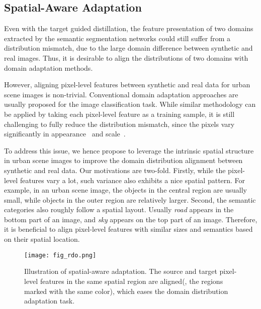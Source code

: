 \documentclass[10pt,twocolumn,letterpaper]{article}
\begin{document}
\subsection{Spatial-Aware Adaptation}
Even with the target guided distillation, the feature presentation of two domains extracted by the semantic segmentation networks could still suffer from a distribution mismatch, due to the large domain difference between synthetic and real images. Thus, it is desirable to align the distributions of two domains with domain adaptation methods. 

However, aligning pixel-level features between synthetic and real data for urban scene images is non-trivial. Conventional domain adaptation approaches are usually proposed for the image classification task. While similar methodology can be applied by taking each pixel-level feature as a training sample, it is still challenging to fully reduce the distribution mismatch, since the pixels vary significantly in appearance~\cite{hoffman2016fcns} and scale~\cite{chen2016scale}.

To address this issue, we hence propose to leverage the intrinsic spatial structure in urban scene images to improve the domain distribution alignment between synthetic and real data. Our motivations are two-fold. Firstly, while the pixel-level features vary a lot, such variance also exhibits a nice spatial pattern. For example, in an urban scene image, the objects in the central region are usually small, while objects in the outer region are relatively larger. Second, the semantic categories also roughly follow a spatial layout. Usually \textit{road} appears in the bottom part of an image, and \textit{sky} appears on the top part of an image. Therefore, it is beneficial to align pixel-level features with similar sizes and semantics based on their spatial location.  

\begin{figure}
\centering
\texttt{[image: fig\_rdo.png]}
\caption{Illustration of spatial-aware adaptation. The source and target pixel-level features in the same spatial region are aligned(\ie, the regions marked with the same color), which eases the domain distribution adaptation task. }
\label{fig:fig_rdo}
\vspace{-4mm}
\end{figure}
\end{document}

